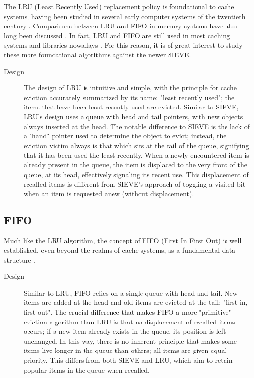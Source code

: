 The LRU (Least Recently Used) replacement policy is foundational to cache systems, having been studied in several early computer systems of the twentieth century \cite{eval-storage-hierarchies, virtual-storage-study}. Comparisons between LRU and FIFO in memory systems have also long been discussed \cite{lru-better-than-fifo}. In fact, LRU and FIFO are still used in most caching systems and libraries nowadays \cite{sieve}. For this reason, it is of great interest to study these more foundational algorithms against the newer SIEVE.

\begin{description}
    \item[Design]
    The design of LRU is intuitive and simple, with the principle for cache eviction accurately summarized by its name: "least recently used"; the items that have been least recently used are evicted. Similar to SIEVE, LRU's design uses a queue with head and tail pointers, with new objects always inserted at the head. The notable difference to SIEVE is the lack of a "hand" pointer used to determine the object to evict; instead, the eviction victim always is that which sits at the tail of the queue, signifying that it has been used the least recently. When a newly encountered item is already present in the queue, the item is displaced to the very front of the queue, at its head, effectively signaling its recent use. This displacement of recalled items is different from SIEVE's approach of toggling a visited bit when an item is requested anew (without displacement).
\end{description}


\subsection{FIFO}

Much like the LRU algorithm, the concept of FIFO (First In First Out) is well established, even beyond the realms of cache systems, as a fundamental data structure \cite{lock-free-fifo}. 

\begin{description}
    \item[Design] Similar to LRU, FIFO relies on a single queue with head and tail. New items are added at the head and old items are evicted at the tail: "first in, first out". The crucial difference that makes FIFO a more "primitive" eviction algorithm than LRU is that no displacement of recalled items occurs; if a new item already exists in the queue, its position is left unchanged. In this way, there is no inherent principle that makes some items live longer in the queue than others; all items are given equal priority. This differs from both SIEVE and LRU, which aim to retain popular items in the queue when recalled.
\end{description}

